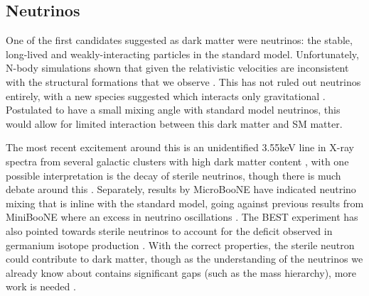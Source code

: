 \subsection{Neutrinos}
\par
One of the first candidates suggested as dark matter were neutrinos: the stable, long-lived and weakly-interacting particles in the standard model.
Unfortunately, N-body simulations shown that given the relativistic velocities are inconsistent with the structural formations that we observe \cite{neutrinos_and_galaxy_clustering_ref}. 
This has not ruled out neutrinos entirely, with a new species suggested which interacts only gravitational \cite{sterile_neutrinos_ref}.
Postulated to have a small mixing angle with standard model neutrinos, this would allow for limited interaction between this dark matter and SM matter.
\par
The most recent excitement around this is an unidentified 3.55keV line in X-ray spectra from several galactic clusters with high dark matter content \cite{sterile_neutrino_xray_decay_ref}, with one possible interpretation is the decay of sterile neutrinos, though there is much debate around this \cite{xray_from_sterile_neutrons_2_ref, xray_from_sterile_neutrons_3_ref}.
Separately, results by MicroBooNE have indicated neutrino mixing that is inline with the standard model, going against previous results from MiniBooNE where an excess in neutrino oscillations \cite{miniboone_and_microboone_sterile_neutrino_ref}.
The BEST experiment has also pointed towards sterile neutrinos to account for the deficit observed in germanium isotope production \cite{best_sterile_neutrino_result_ref,best_sterile_neutrino_2_ref}.
With the correct properties, the sterile neutron could contribute to dark matter, though as the understanding of the neutrinos we already know about contains significant gaps (such as the mass hierarchy), more work is needed \cite{sterile_neutrino_as_dm_ref, sterile_neutrinos_dm_ref}.

